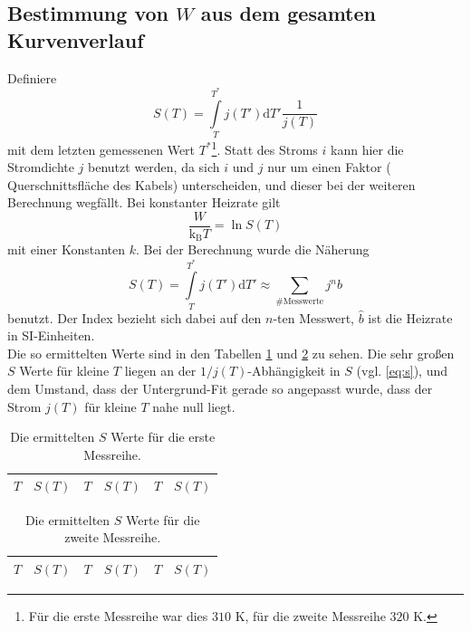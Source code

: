 \subsection{Bestimmung von $W$ aus dem gesamten Kurvenverlauf}
Definiere
\begin{equation}
S(T)=\int\limits_T^{T^*} j(T') \text{d}T' \frac{1}{j(T)} \label{eq:s}
\end{equation}
mit dem letzten gemessenen Wert $T^*$\footnote{Für die erste Messreihe war dies $310$ K, für
die zweite Messreihe $320$ K.}. Statt des Stroms $i$ kann hier die
Stromdichte $j$ benutzt werden, da sich $i$ und $j$ nur um einen Faktor (
Querschnittsfläche des Kabels) unterscheiden, und dieser bei der weiteren
Berechnung wegfällt.
Bei konstanter Heizrate gilt
\begin{equation}
\frac{W}{\text{k}_\text{B} T}=\ln S(T)
\end{equation}
mit einer Konstanten $k$. Bei der Berechnung wurde die Näherung
\begin{equation}
S(T)=\int\limits_T^{T^*} j(T') \text{d}T' \approx \sum\limits_{\#\text{Messwerte}} j^n  \hat{b}
\end{equation}
benutzt. Der Index bezieht sich dabei auf den $n$-ten Messwert, $\hat{b}$ ist die
Heizrate in SI-Einheiten.\\
Die so ermittelten Werte sind in den Tabellen \ref{tab:3} und \ref{tab:4} zu sehen. Die
sehr großen $S$ Werte für kleine $T$ liegen an der $1/j(T)$-Abhängigkeit in $S$ (vgl.
\eqref{eq:s}),
und dem Umstand, dass der Untergrund-Fit gerade so angepasst wurde, dass der Strom $j(T)$ für
kleine $T$ nahe null liegt.

\begin{table}
\centering
\begin{tabular}{cccccc}
\toprule
\midrule
$T$ & $S(T)$&$T$ & $S(T)$&$T$ & $S(T)$ \\
\midrule

\midrule
\bottomrule
\end{tabular}
\caption{Die ermittelten $S$ Werte für die erste Messreihe.}
\label{tab:3}
\end{table}

\begin{table}
\centering
\begin{tabular}{cccccc}
\toprule
\midrule
$T$ & $S(T)$&$T$ & $S(T)$&$T$ & $S(T)$ \\
\midrule

\midrule
\bottomrule
\end{tabular}
\caption{Die ermittelten $S$ Werte für die zweite Messreihe.}
\label{tab:4}
\end{table}


